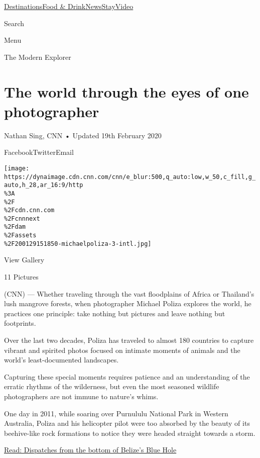 \href{/}{}\href{/travel}{}

\href{/travel/destinations}{Destinations}\href{/travel/food-and-drink}{Food
\&
Drink}\href{/travel/news}{News}\href{/travel/stay}{Stay}\href{/travel/videos}{Video}

Search

Menu

\href{/specials/world/the-modern-explorers}{}

The Modern Explorer

\hypertarget{the-world-through-the-eyes-of-one-photographer}{%
\section{The world through the eyes of one
photographer}\label{the-world-through-the-eyes-of-one-photographer}}

Nathan Sing, CNN • Updated 19th February 2020

FacebookTwitterEmail

\texttt{[image: https://dynaimage.cdn.cnn.com/cnn/e\_blur:500,q\_auto:low,w\_50,c\_fill,g\_auto,h\_28,ar\_16:9/http\\\%3A\\\%2F\\\%2Fcdn.cnn.com\\\%2Fcnnnext\\\%2Fdam\\\%2Fassets\\\%2F200129151850-michaelpoliza-3-intl.jpg]}

View Gallery

11 Pictures

(CNN) --- Whether traveling through the vast floodplains of Africa or
Thailand's lush mangrove forests, when photographer Michael Poliza
explores the world, he practices one principle: take nothing but
pictures and leave nothing but footprints.

Over the last two decades, Poliza has traveled to almost 180 countries
to capture vibrant and spirited photos focused on intimate moments of
animals and the world's least-documented landscapes.

Capturing these special moments requires patience and an understanding
of the erratic rhythms of the wilderness, but even the most seasoned
wildlife photographers are not immune to nature's whims.

One day in 2011, while soaring over Purnululu National Park in Western
Australia, Poliza and his helicopter pilot were too absorbed by the
beauty of its beehive-like rock formations to notice they were headed
straight towards a storm.

\href{http://www.cnn.com/travel/article/blue-hole-belize-expedition/index.html}{Read:
Dispatches from the bottom of Belize's Blue Hole}

